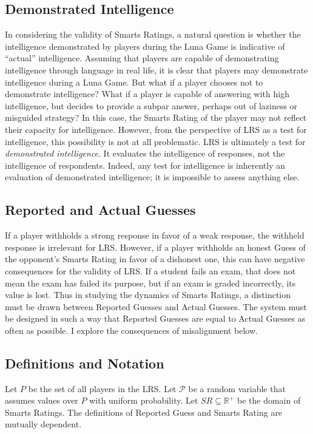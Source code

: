 \subsection{Demonstrated Intelligence}

In considering the validity of Smarts Ratings, a natural question is whether the intelligence demonstrated by players during the Luna Game is indicative of ``actual'' intelligence. Assuming that players are capable of demonstrating intelligence through language in real life, it is clear that players may demonstrate intelligence during a Luna Game. But what if a player chooses not to demonstrate intelligence? What if a player is capable of answering with high intelligence, but decides to provide a subpar answer, perhaps out of laziness or misguided strategy? In this case, the Smarts Rating of the player may not reflect their capacity for intelligence. However, from the perspective of LRS as a test for intelligence, this possibility is not at all problematic. LRS is ultimately a test for \textit{demonstrated intelligence}. It evaluates the intelligence of responses, not the intelligence of respondents. Indeed, any test for intelligence is inherently an evaluation of demonstrated intelligence; it is impossible to assess anything else. 

\subsection{Reported and Actual Guesses}

If a player withholds a strong response in favor of a weak response, the withheld response is irrelevant for LRS. However, if a player withholds an honest Guess of the opponent's Smarts Rating in favor of a dishonest one, this can have negative consequences for the validity of LRS. If a student fails an exam, that does not mean the exam has failed its purpose, but if an exam is graded incorrectly, its value is lost. Thus in studying the dynamics of Smarts Ratings, a distinction must be drawn between Reported Guesses and Actual Guesses. The system must be designed in such a way that Reported Guesses are equal to Actual Guesses as often as possible. I explore the consequences of misalignment below.


\subsection{Definitions and Notation}

Let $P$ be the set of all players in the LRS. Let $\mathcal{P}$ be a random variable that assumes values over $P$ with uniform probability. Let $SR \subseteq \mathbb{R}^+$ be the domain of Smarts Ratings. The definitions of Reported Guess and Smarts Rating are mutually dependent.

